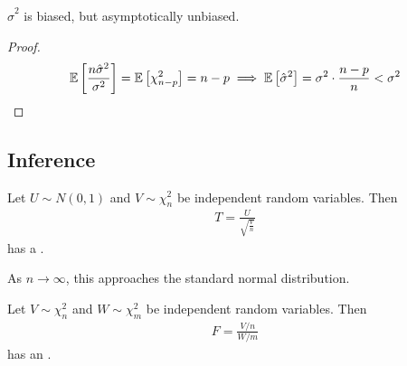 \begin{corollary}
	$\hat{\sigma}^2$ is biased, but asymptotically unbiased.
\end{corollary} 

\begin{proof}
	\begin{align*}
		\mathbb{E}\left[{\frac{n\hat\sigma^2}{\sigma^2}}\right] = \mathbb{E}\left[{\chi^2_{n-p}}\right] = n-p \implies \mathbb{E}\left[{\hat\sigma^2}\right] = \sigma^2 \cdot \frac{n-p}{n} < \sigma^2
	\end{align*}
\end{proof} 

\subsection{Inference}

\begin{definition}[$t$-distribution]
	Let $U \sim N(0,1)$ and $V \sim \chi^2_n$ be independent random variables.
	Then
	\begin{align*}
		T = \frac{U}{\sqrt{\frac{V}{n}}}
	\end{align*}
	has a .
\end{definition}

As $n \to \infty$, this approaches the standard normal distribution.

\begin{definition}[$F$-distribution]
	Let $V \sim \chi^2_n$ and $W \sim \chi^2_m$ be independent random variables.
	Then
	\begin{align*}
		F = \frac{V/n}{W/m}
	\end{align*}
	has an .
\end{definition}

